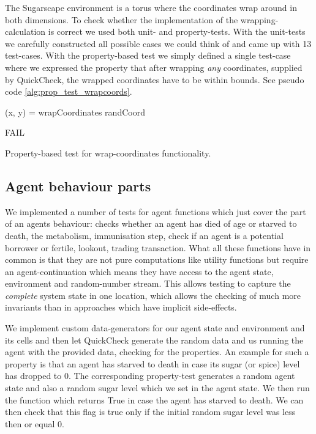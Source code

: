 The Sugarscape environment is a torus where the coordinates wrap around in both dimensions. To check whether the implementation of the wrapping-calculation is correct we used both unit- and property-tests. With the unit-tests we carefully constructed all possible cases we could think of and came up with 13 test-cases. With the property-based test we simply defined a single test-case where we expressed the property that after wrapping \textit{any} coordinates, supplied by QuickCheck, the wrapped coordinates have to be within bounds. See pseudo code \ref{alg:prop_test_wrapcoords}.

\begin{algorithm}
(x, y) = wrapCoordinates randCoord\;

 {
  FAIL\;
}
\caption{Property-based test for wrap-coordinates functionality.}
\end{algorithm}
\label{alg:prop_test_wrapcoords}

\subsection{Agent behaviour parts}
We implemented a number of tests for agent functions which just cover the part of an agents behaviour: checks whether an agent has died of age or starved to death, the metabolism, immunisation step, check if an agent is a potential borrower or fertile, lookout, trading transaction. What all these functions have in common is that they are not pure computations like utility functions but require an agent-continuation which means they have access to the agent state, environment and random-number stream. This allows testing to capture the \textit{complete} system state in one location, which allows the checking of much more invariants than in approaches which have implicit side-effects.

We implement custom data-generators for our agent state and environment and its cells and then let QuickCheck generate the random data and us running the agent with the provided data, checking for the properties. An example for such a property is that an agent has starved to death in case its sugar (or spice) level has dropped to 0. The corresponding property-test generates a random agent state and also a random sugar level which we set in the agent state. We then run the function which returns True in case the agent has starved to death. We can then check that this flag is true only if the initial random sugar level was less then or equal 0.

